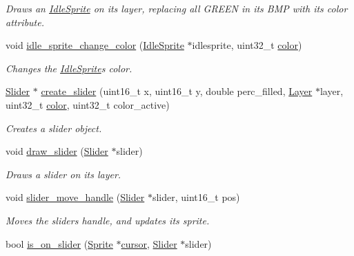 \begin{DoxyCompactItemize}
\begin{DoxyCompactList}\small\item\em Draws an \mbox{\hyperlink{struct_idle_sprite}{Idle\+Sprite}} on its layer, replacing all G\+R\+E\+EN in its B\+MP with its color attribute. \end{DoxyCompactList}\item 
void \mbox{\hyperlink{group__sprite_gabae3594520c7d515ffda965caae199af}{idle\+\_\+sprite\+\_\+change\+\_\+color}} (\mbox{\hyperlink{struct_idle_sprite}{Idle\+Sprite}} $\ast$idlesprite, uint32\+\_\+t \mbox{\hyperlink{structcolor}{color}})
\begin{DoxyCompactList}\small\item\em Changes the \mbox{\hyperlink{struct_idle_sprite}{Idle\+Sprite}}\textquotesingle{}s color. \end{DoxyCompactList}\item 
\mbox{\hyperlink{struct_slider}{Slider}} $\ast$ \mbox{\hyperlink{group__sprite_gac479773f83a2e428343ce29e775d90ec}{create\+\_\+slider}} (uint16\+\_\+t x, uint16\+\_\+t y, double perc\+\_\+filled, \mbox{\hyperlink{struct_layer}{Layer}} $\ast$layer, uint32\+\_\+t \mbox{\hyperlink{structcolor}{color}}, uint32\+\_\+t color\+\_\+active)
\begin{DoxyCompactList}\small\item\em Creates a slider object. \end{DoxyCompactList}\item 
void \mbox{\hyperlink{group__sprite_ga68e5ecf620b6fc346c992ef0eb49535f}{draw\+\_\+slider}} (\mbox{\hyperlink{struct_slider}{Slider}} $\ast$slider)
\begin{DoxyCompactList}\small\item\em Draws a slider on its layer. \end{DoxyCompactList}\item 
void \mbox{\hyperlink{group__sprite_ga3f6696185609cd55e3535258deb30ea7}{slider\+\_\+move\+\_\+handle}} (\mbox{\hyperlink{struct_slider}{Slider}} $\ast$slider, uint16\+\_\+t pos)
\begin{DoxyCompactList}\small\item\em Moves the sliders handle, and updates its sprite. \end{DoxyCompactList}\item 
bool \mbox{\hyperlink{group__sprite_gaa77fff83958c7ed7ab6e99a25d574ce2}{is\+\_\+on\+\_\+slider}} (\mbox{\hyperlink{struct_sprite}{Sprite}} $\ast$\mbox{\hyperlink{pengoo_8c_a3a7ea4305773abf5347bb261a8a5c16b}{cursor}}, \mbox{\hyperlink{struct_slider}{Slider}} $\ast$slider)

\end{DoxyCompactItemize}
